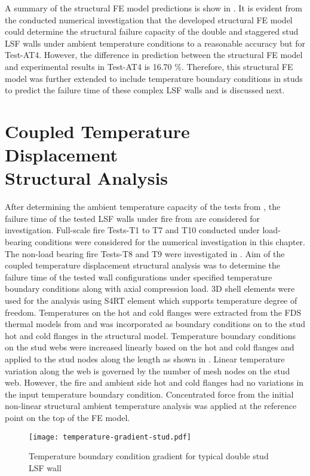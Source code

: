 A summary of the structural FE model predictions is show in . It is evident from the conducted numerical investigation that the developed structural FE model could determine the structural failure capacity of the double and staggered stud LSF walls under ambient temperature conditions to a reasonable accuracy but for Test-AT4. However, the difference in prediction between the structural FE model and experimental results in Test-AT4 is 16.70 \%. Therefore, this structural FE model was further extended to include temperature boundary conditions in studs to predict the failure time of these complex LSF walls and is discussed next. 

\section[Coupled Temperature Displacement Structural Analysis]{Coupled Temperature Displacement \\Structural Analysis}\label{sec:temp-disp-structural}

After determining the ambient temperature capacity of the tests from , the failure time of the tested LSF walls under fire from  are considered for investigation. Full-scale fire Tests-T1 to T7 and T10 conducted under load-bearing conditions were considered for the numerical investigation in this chapter. The non-load bearing fire Tests-T8 and T9 were investigated in . Aim of the coupled temperature displacement structural analysis was to determine the failure time of the tested wall configurations under specified temperature boundary conditions along with axial compression load. 3D shell elements were used for the analysis using S4RT element which supports temperature degree of freedom. Temperatures on the hot and cold flanges were extracted from the FDS thermal models from  and was incorporated as boundary conditions on to the stud hot and cold flanges in the structural model. Temperature boundary conditions on the stud webs were increased linearly based on the hot and cold flanges and applied to the stud nodes along the length as shown in . Linear temperature variation along the web is governed by the number of mesh nodes on the stud web. However, the fire and ambient side hot and cold flanges had no variations in the input temperature boundary condition. Concentrated force from the initial non-linear structural ambient temperature analysis was applied at the reference point on the top of the FE model. 
\begin{figure}[!htbp]
	\centering
			\texttt{[image: temperature-gradient-stud.pdf]}\\
		\caption{Temperature boundary condition gradient for typical double stud LSF wall}
		\label{fig:temperature-gradient-stud}
\end{figure}

